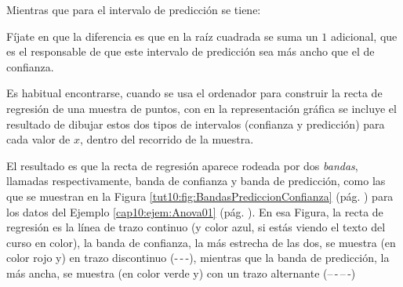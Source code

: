 Mientras que para el intervalo de predicción se tiene:
    \begin{center}
    \end{center}
Fíjate en que la diferencia es que en la raíz cuadrada se suma un $1$ adicional, que es el responsable de que este intervalo de predicción sea más ancho que el de confianza.

Es habitual encontrarse, cuando se usa el ordenador para construir la recta de regresión de una muestra de puntos, con en la representación gráfica se incluye el resultado de dibujar estos dos tipos de intervalos (confianza y predicción) para cada valor de $x$, dentro del recorrido de la muestra.

El resultado es que la recta de regresión aparece rodeada por dos {\em bandas}, llamadas respectivamente, {\sf banda de confianza} y {\sf banda de predicción}, como las que se muestran en la Figura \ref{tut10:fig:BandasPrediccionConfianza} (pág. \pageref{tut10:fig:BandasPrediccionConfianza}) para  los datos del Ejemplo \ref{cap10:ejem:Anova01} (pág. \pageref{cap10:ejem:Anova01}). En esa Figura, la recta de regresión es la línea de trazo continuo (y color azul, si estás viendo el texto del curso en color), la banda de confianza, la más estrecha de las dos, se muestra (en color rojo y) en trazo discontinuo (-\,-\,-), mientras que la banda de predicción, la más ancha, se muestra (en color verde y) con un trazo alternante (--\,-\,--\,-)

